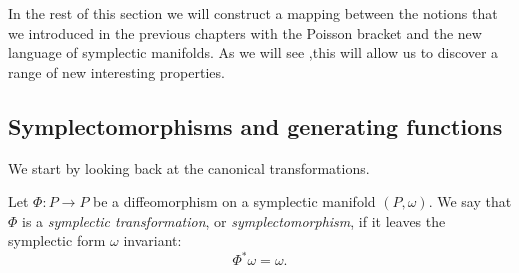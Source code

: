 \documentclass[english,fontsize=11pt,paper=b5]{scrbook}
\theoremstyle{definition}
\begin{document}
    In the rest of this section we will construct a mapping between the notions that we introduced in the previous chapters with the Poisson bracket and the new language of symplectic manifolds.
    As we will see ,this will allow us to discover a range of new interesting properties.

    \subsection{Symplectomorphisms and generating functions}

    We start by looking back at the canonical transformations.

    \begin{tcolorbox}
      Let $\Phi: P \to P$ be a diffeomorphism on a symplectic manifold $(P,\omega)$.
      We say that $\Phi$ is a \emph{symplectic transformation}, or \emph{symplectomorphism}, if it leaves the symplectic form $\omega$ invariant:
      \begin{equation}\label{eq:symplectomorphism}
        \Phi^* \omega = \omega.
      \end{equation}
    \end{tcolorbox}
\end{document}
